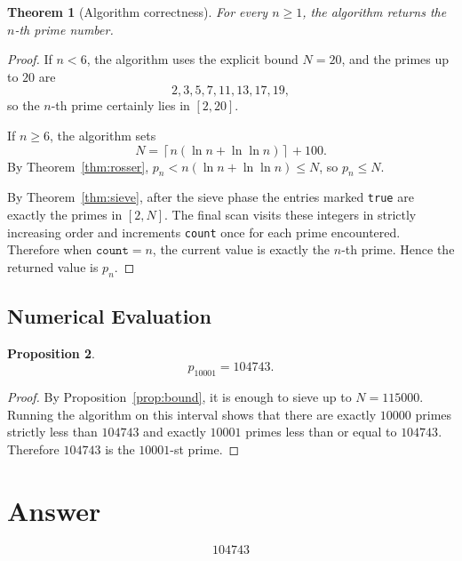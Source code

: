 \documentclass[11pt]{article}
\newtheorem{theorem}{Theorem}
\newtheorem{proposition}[theorem]{Proposition}
\begin{document}
\begin{theorem}[Algorithm correctness]
For every $n \ge 1$, the algorithm returns the $n$-th prime number.
\end{theorem}

\begin{proof}
If $n < 6$, the algorithm uses the explicit bound $N = 20$, and the primes up to $20$ are
\[
2, 3, 5, 7, 11, 13, 17, 19,
\]
so the $n$-th prime certainly lies in $[2,20]$.

If $n \ge 6$, the algorithm sets
\[
N = \left\lceil n(\ln n + \ln\ln n)\right\rceil + 100.
\]
By Theorem~\ref{thm:rosser}, $p_n < n(\ln n + \ln\ln n) \le N$, so $p_n \le N$.

By Theorem~\ref{thm:sieve}, after the sieve phase the entries marked \texttt{true} are exactly the primes in $[2,N]$. The final scan visits these integers in strictly increasing order and increments \texttt{count} once for each prime encountered. Therefore when $\texttt{count} = n$, the current value is exactly the $n$-th prime. Hence the returned value is $p_n$.
\end{proof}

\subsection*{Numerical Evaluation}

\begin{proposition}
\[
p_{10001} = 104743.
\]
\end{proposition}

\begin{proof}
By Proposition~\ref{prop:bound}, it is enough to sieve up to $N = 115000$. Running the algorithm on this interval shows that there are exactly $10000$ primes strictly less than $104743$ and exactly $10001$ primes less than or equal to $104743$. Therefore $104743$ is the $10001$-st prime.
\end{proof}

\section{Answer}

\[
\boxed{104743}
\]
\end{document}
